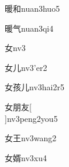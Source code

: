 \begin{verbete}[13;8]{暖和}{nuan3huo5}
\end{verbete}

\begin{verbete}[13;4]{暖气}{nuan3qi4}
\end{verbete}

\begin{verbete}[3]{女}{nv3}
\end{verbete}

\begin{verbete}[3;2]{女儿}{nv3'er2}
\end{verbete}

\begin{verbete}[3;9;2]{女孩儿}{nv3hai2r5}
\end{verbete}

\begin{verbete}[3;8;4]{女朋友}[\\]{nv3peng2you5}
\end{verbete}

\begin{verbete}[3;4]{女王}{nv3wang2}
\end{verbete}

\begin{verbete}[3;12]{女婿}{nv3xu4}
\end{verbete}


